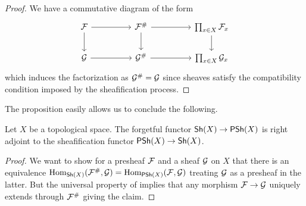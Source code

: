 \begin{proof}
    We have a commutative diagram of the form 
    $$%
    \begin{tikzcd}
        \Fcal && {\Fcal^{\#}} && {\prod_{x\in X}\Fcal_{x}} \\
        \Gcal && {\Gcal^{\#}} && {\prod_{x\in X}\Gcal_{x}}
        \arrow[from=1-1, to=1-3]
        \arrow[from=1-1, to=2-1]
        \arrow[from=1-3, to=1-5]
        \arrow[from=1-3, to=2-3]
        \arrow[from=1-5, to=2-5]
        \arrow[from=2-1, to=2-3]
        \arrow[from=2-3, to=2-5]
    \end{tikzcd}$$
    which induces the factorization as $\mathcal{G}^{\#}=\mathcal{G}$ since sheaves satisfy the compatibility condition imposed by the sheafification process.
\end{proof}
The proposition easily allows us to conclude the following. 
\begin{proposition}\label{prop: forgetful is adjoint to sheafification}
    Let $X$ be a topological space. The forgetful functor $\mathsf{Sh}(X)\to\mathsf{PSh}(X)$ is right adjoint to the sheafification functor $\mathsf{PSh}(X)\to\mathsf{Sh}(X)$.  
\end{proposition}
\begin{proof}
    We want to show for a presheaf $\mathcal{F}$ and a sheaf $\mathcal{G}$ on $X$ that there is an equivalence $\mathrm{Hom}_{\mathsf{Sh}(X)}(\mathcal{F}^{\#},\mathcal{G})=\mathrm{Hom}_{\mathsf{PSh}(X)}(\mathcal{F},\mathcal{G})$ treating $\mathcal{G}$ as a presheaf in the latter. But the universal property of  implies that any morphism $\mathcal{F}\to\mathcal{G}$ uniquely extends through $\mathcal{F}^{\#}$ giving the claim. 
\end{proof}